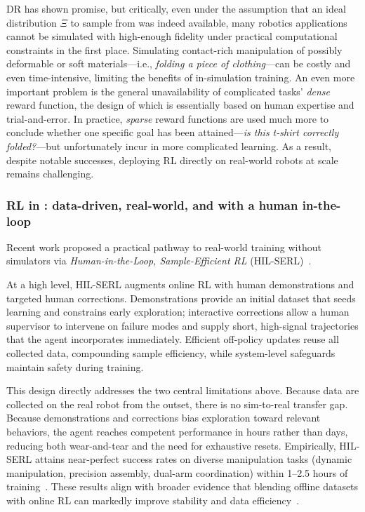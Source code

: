 DR has shown promise, but critically, even under the assumption that an ideal distribution \( \Xi \) to sample from was indeed available, many robotics applications cannot be simulated with high-enough fidelity under practical computational constraints in the first place.
Simulating contact-rich manipulation of possibly deformable or soft materials---i.e., \emph{folding a piece of clothing}---can be costly and even time-intensive, limiting the benefits of in-simulation training.
An even more important problem is the general unavailability of complicated tasks' \emph{dense} reward function, the design of which is essentially based on human expertise and trial-and-error.
In practice, \emph{sparse} reward functions are used much more to conclude whether one specific goal has been attained---\emph{is this t-shirt correctly folded?}---but unfortunately incur in more complicated learning.
As a result, despite notable successes, deploying RL directly on real-world robots at scale remains challenging.

\subsubsection{RL in \lerobot: data-driven, real-world, and with a human in-the-loop}


Recent work proposed a practical pathway to real-world training without simulators via \emph{Human-in-the-Loop, Sample-Efficient RL} (HIL-SERL)~\citep{luoPreciseDexterousRobotic2024}.

At a high level, HIL-SERL augments online RL with human demonstrations and targeted human corrections. Demonstrations provide an initial dataset that seeds learning and constrains early exploration; interactive corrections allow a human supervisor to intervene on failure modes and supply short, high-signal trajectories that the agent incorporates immediately. Efficient off-policy updates reuse all collected data, compounding sample efficiency, while system-level safeguards maintain safety during training.

This design directly addresses the two central limitations above. Because data are collected on the real robot from the outset, there is no sim-to-real transfer gap. Because demonstrations and corrections bias exploration toward relevant behaviors, the agent reaches competent performance in hours rather than days, reducing both wear-and-tear and the need for exhaustive resets. Empirically, HIL-SERL attains near-perfect success rates on diverse manipulation tasks (dynamic manipulation, precision assembly, dual-arm coordination) within 1--2.5 hours of training~\citep{luoPreciseDexterousRobotic2024}. These results align with broader evidence that blending offline datasets with online RL can markedly improve stability and data efficiency~\citep{ballEfficientOnlineReinforcement2023}.

